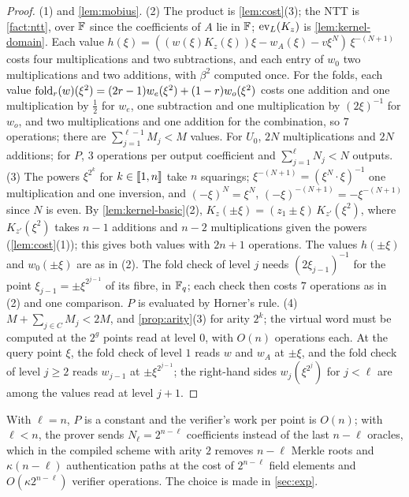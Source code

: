 \begin{proof}
(1)  and \cref{lem:mobius}.
(2) The product is \cref{lem:cost}(3); the NTT is \cref{fact:ntt}, over $\mathbb{F}$ since the coefficients of $A$ lie in $\mathbb{F}$; $\mathrm{ev}_L(K_z)$ is \cref{lem:kernel-domain}. Each value $h(\xi) = ((w(\xi)K_z(\xi))\xi - w_A(\xi) - v\xi^N)\,\xi^{-(N+1)}$ costs four multiplications and two subtractions, and each entry of $w_0$ two multiplications and two additions, with $\beta^2$ computed once. For the folds, each value $\mathrm{fold}_r(w)(\xi^2) = (2r-1)w_e(\xi^2) + (1-r)w_o(\xi^2)$ costs one addition and one multiplication by $\tfrac12$ for $w_e$, one subtraction and one multiplication by $(2\xi)^{-1}$ for $w_o$, and two multiplications and one addition for the combination, so $7$ operations; there are $\sum_{j=1}^{\ell-1} M_j < M$ values. For $U_0$, $2N$ multiplications and $2N$ additions; for $P$, $3$ operations per output coefficient and $\sum_{j=1}^{\ell} N_j < N$ outputs.
(3) The powers $\xi^{2^k}$ for $k \in \llbracket 1, n \rrbracket$ take $n$ squarings; $\xi^{-(N+1)} = (\xi^N \cdot \xi)^{-1}$ one multiplication and one inversion, and $(-\xi)^{N} = \xi^N$, $(-\xi)^{-(N+1)} = -\xi^{-(N+1)}$ since $N$ is even. By \cref{lem:kernel-basic}(2), $K_z(\pm\xi) = (z_1 \pm \xi)\,K_{z'}(\xi^2)$, where $K_{z'}(\xi^2)$ takes $n-1$ additions and $n-2$ multiplications given the powers (\cref{lem:cost}(1)); this gives both values with $2n+1$ operations. The values $h(\pm\xi)$ and $w_0(\pm\xi)$ are as in (2). The fold check of level $j$ needs $(2\xi_{j-1})^{-1}$ for the point $\xi_{j-1} = \pm\xi^{2^{j-1}}$ of its fibre, in $\mathbb{F}_q$; each check then costs $7$ operations as in (2) and one comparison. $P$ is evaluated by Horner's rule.
(4) $M + \sum_{j \in C} M_j < 2M$, and \cref{prop:arity}(3) for arity $2^k$; the virtual word must be computed at the $2^{g}$ points read at level $0$, with $O(n)$ operations each. At the query point $\xi$, the fold check of level $1$ reads $w$ and $w_A$ at $\pm\xi$, and the fold check of level $j \ge 2$ reads $w_{j-1}$ at $\pm\xi^{2^{j-1}}$; the right-hand sides $w_j(\xi^{2^j})$ for $j < \ell$ are among the values read at level $j+1$.
\end{proof}

\begin{remark}\label{rem:ell}
With $\ell = n$, $P$ is a constant and the verifier's work per point is $O(n)$; with $\ell < n$, the prover sends $N_\ell = 2^{n-\ell}$ coefficients instead of the last $n - \ell$ oracles, which in the compiled scheme with arity $2$ removes $n-\ell$ Merkle roots and $\kappa(n-\ell)$ authentication paths at the cost of $2^{n-\ell}$ field elements and $O(\kappa 2^{n-\ell})$ verifier operations. The choice is made in \cref{sec:exp}.
\end{remark}

